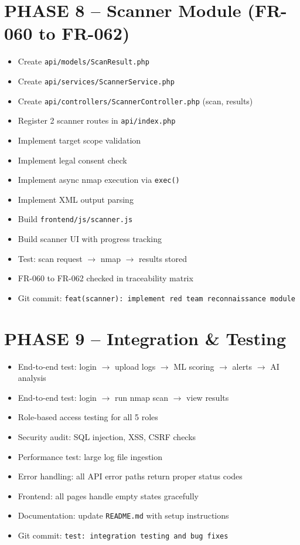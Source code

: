 \documentclass[11pt,a4paper]{article}
\newcommand{\undone}{\textcolor{helixgray}{\texttt{[ ] }}}
\newcommand{\filepath}[1]{\texttt{\small#1}}
\newcommand{\task}[2]{\item[#1] #2}
\begin{document}
\section{PHASE 8 -- Scanner Module (FR-060 to FR-062)}

\begin{itemize}
    \task{\undone}{Create \filepath{api/models/ScanResult.php}}
    \task{\undone}{Create \filepath{api/services/ScannerService.php}}
    \task{\undone}{Create \filepath{api/controllers/ScannerController.php} (scan, results)}
    \task{\undone}{Register 2 scanner routes in \filepath{api/index.php}}
    \task{\undone}{Implement target scope validation}
    \task{\undone}{Implement legal consent check}
    \task{\undone}{Implement async nmap execution via \texttt{exec()}}
    \task{\undone}{Implement XML output parsing}
    \task{\undone}{Build \filepath{frontend/js/scanner.js}}
    \task{\undone}{Build scanner UI with progress tracking}
    \task{\undone}{Test: scan request $\rightarrow$ nmap $\rightarrow$ results stored}
    \task{\undone}{FR-060 to FR-062 checked in traceability matrix}
    \task{\undone}{Git commit: \texttt{feat(scanner): implement red team reconnaissance module}}
\end{itemize}

\section{PHASE 9 -- Integration \& Testing}

\begin{itemize}
    \task{\undone}{End-to-end test: login $\rightarrow$ upload logs $\rightarrow$ ML scoring $\rightarrow$ alerts $\rightarrow$ AI analysis}
    \task{\undone}{End-to-end test: login $\rightarrow$ run nmap scan $\rightarrow$ view results}
    \task{\undone}{Role-based access testing for all 5 roles}
    \task{\undone}{Security audit: SQL injection, XSS, CSRF checks}
    \task{\undone}{Performance test: large log file ingestion}
    \task{\undone}{Error handling: all API error paths return proper status codes}
    \task{\undone}{Frontend: all pages handle empty states gracefully}
    \task{\undone}{Documentation: update \filepath{README.md} with setup instructions}
    \task{\undone}{Git commit: \texttt{test: integration testing and bug fixes}}
\end{itemize}
\end{document}
